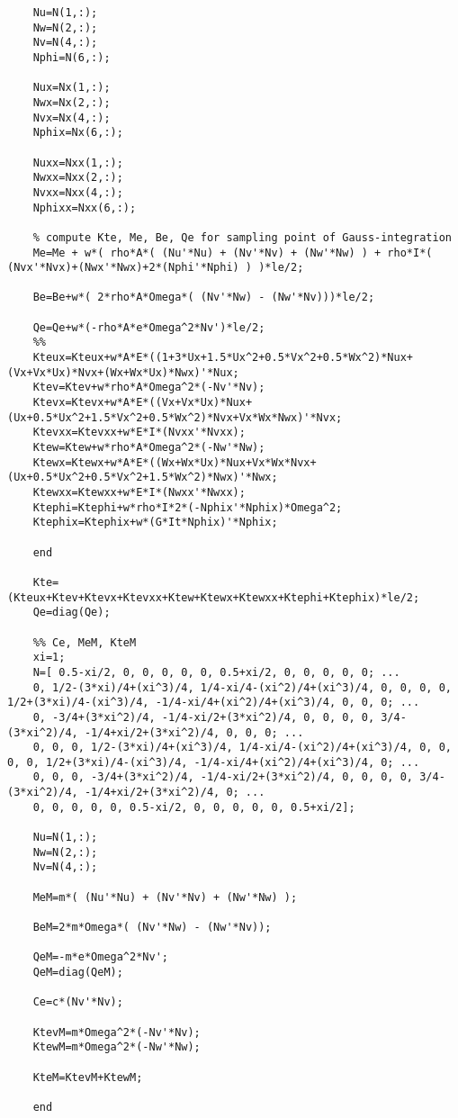 \begin{lstlisting}
	Nu=N(1,:);
	Nw=N(2,:);
	Nv=N(4,:);
	Nphi=N(6,:);
	
	Nux=Nx(1,:);
	Nwx=Nx(2,:);
	Nvx=Nx(4,:);
	Nphix=Nx(6,:);
	
	Nuxx=Nxx(1,:);
	Nwxx=Nxx(2,:);
	Nvxx=Nxx(4,:);
	Nphixx=Nxx(6,:);
	
	% compute Kte, Me, Be, Qe for sampling point of Gauss-integration
	Me=Me + w*( rho*A*( (Nu'*Nu) + (Nv'*Nv) + (Nw'*Nw) ) + rho*I*( (Nvx'*Nvx)+(Nwx'*Nwx)+2*(Nphi'*Nphi) ) )*le/2;
	
	Be=Be+w*( 2*rho*A*Omega*( (Nv'*Nw) - (Nw'*Nv)))*le/2;
	
	Qe=Qe+w*(-rho*A*e*Omega^2*Nv')*le/2;
	%%
	Kteux=Kteux+w*A*E*((1+3*Ux+1.5*Ux^2+0.5*Vx^2+0.5*Wx^2)*Nux+(Vx+Vx*Ux)*Nvx+(Wx+Wx*Ux)*Nwx)'*Nux;
	Ktev=Ktev+w*rho*A*Omega^2*(-Nv'*Nv);
	Ktevx=Ktevx+w*A*E*((Vx+Vx*Ux)*Nux+(Ux+0.5*Ux^2+1.5*Vx^2+0.5*Wx^2)*Nvx+Vx*Wx*Nwx)'*Nvx;
	Ktevxx=Ktevxx+w*E*I*(Nvxx'*Nvxx);
	Ktew=Ktew+w*rho*A*Omega^2*(-Nw'*Nw);
	Ktewx=Ktewx+w*A*E*((Wx+Wx*Ux)*Nux+Vx*Wx*Nvx+(Ux+0.5*Ux^2+0.5*Vx^2+1.5*Wx^2)*Nwx)'*Nwx;
	Ktewxx=Ktewxx+w*E*I*(Nwxx'*Nwxx);
	Ktephi=Ktephi+w*rho*I*2*(-Nphix'*Nphix)*Omega^2;
	Ktephix=Ktephix+w*(G*It*Nphix)'*Nphix;
	
	end
	
	Kte=(Kteux+Ktev+Ktevx+Ktevxx+Ktew+Ktewx+Ktewxx+Ktephi+Ktephix)*le/2;
	Qe=diag(Qe);
	
	%% Ce, MeM, KteM
	xi=1;
	N=[ 0.5-xi/2, 0, 0, 0, 0, 0, 0.5+xi/2, 0, 0, 0, 0, 0; ...
	0, 1/2-(3*xi)/4+(xi^3)/4, 1/4-xi/4-(xi^2)/4+(xi^3)/4, 0, 0, 0, 0, 1/2+(3*xi)/4-(xi^3)/4, -1/4-xi/4+(xi^2)/4+(xi^3)/4, 0, 0, 0; ...
	0, -3/4+(3*xi^2)/4, -1/4-xi/2+(3*xi^2)/4, 0, 0, 0, 0, 3/4-(3*xi^2)/4, -1/4+xi/2+(3*xi^2)/4, 0, 0, 0; ...
	0, 0, 0, 1/2-(3*xi)/4+(xi^3)/4, 1/4-xi/4-(xi^2)/4+(xi^3)/4, 0, 0, 0, 0, 1/2+(3*xi)/4-(xi^3)/4, -1/4-xi/4+(xi^2)/4+(xi^3)/4, 0; ...
	0, 0, 0, -3/4+(3*xi^2)/4, -1/4-xi/2+(3*xi^2)/4, 0, 0, 0, 0, 3/4-(3*xi^2)/4, -1/4+xi/2+(3*xi^2)/4, 0; ...
	0, 0, 0, 0, 0, 0.5-xi/2, 0, 0, 0, 0, 0, 0.5+xi/2];
	
	Nu=N(1,:);
	Nw=N(2,:);
	Nv=N(4,:);
	
	MeM=m*( (Nu'*Nu) + (Nv'*Nv) + (Nw'*Nw) );
	
	BeM=2*m*Omega*( (Nv'*Nw) - (Nw'*Nv));
	
	QeM=-m*e*Omega^2*Nv';
	QeM=diag(QeM);
	
	Ce=c*(Nv'*Nv);
	
	KtevM=m*Omega^2*(-Nv'*Nv);
	KtewM=m*Omega^2*(-Nw'*Nw);
	
	KteM=KtevM+KtewM;
	
	end
	\end{lstlisting}
	